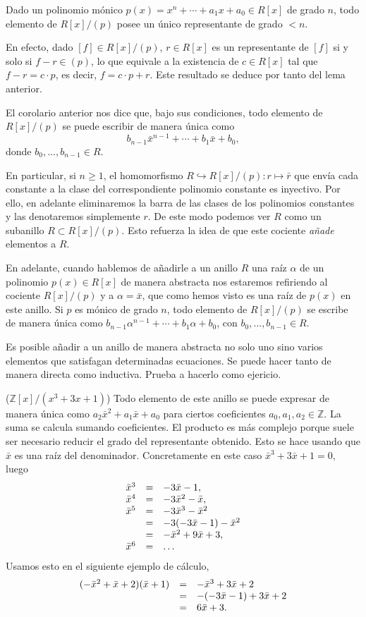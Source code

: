 \label{uniquerep} Dado un polinomio mónico
\(p(x)=x^n+\cdots + a_1x+ a_0\in R[x]\) de grado \(n\), todo elemento
de \(R[x]/(p)\) posee un único representante de grado \(<n\).


En efecto, dado \([f]\in R[x]/(p)\), \(r\in R[x]\) es un representante
de \([f]\) si y solo si \(f-r\in (p)\), lo que equivale a la existencia
de \(c\in R[x]\) tal que \(f-r=c\cdot p\), es decir, \(f=c\cdot p+r\).
Este resultado se deduce por tanto del lema anterior. 


El corolario anterior nos dice que, bajo sus condiciones, todo elemento
de \(R[x]/(p)\) se puede escribir de manera única como
\[b_{n-1}\bar{x}^{n-1}+\cdots+ b_1\bar{x}+b_0,\] donde
\(b_0,\dots, b_{n-1}\in R\).

En particular, si \(n\geq 1\), el homomorfismo
\(R\hookrightarrow R[x]/(p)\colon r\mapsto\bar{r}\) que envía cada
constante a la clase del correspondiente polinomio constante es
inyectivo. Por ello, en adelante eliminaremos la barra de las clases de
los polinomios constantes y las denotaremos simplemente \(r\). De este
modo podemos ver \(R\) como un subanillo \(R\subset R[x]/(p)\). Esto
refuerza la idea de que este cociente \emph{añade} elementos a \(R\).

En adelante, cuando hablemos de añadirle a un anillo \(R\) una raíz
\(\alpha\) de un polinomio \(p(x)\in R[x]\) de manera abstracta nos
estaremos refiriendo al cociente \(R[x]/(p)\) y a \(\alpha=\bar{x}\),
que como hemos visto es una raíz de \(p(x)\) en este anillo. Si \(p\) es
mónico de grado \(n\), todo elemento de \(R[x]/(p)\) se escribe de
manera única como \(b_{n-1}\alpha^{n-1}+\cdots+ b_1\alpha+b_0\), con
\(b_0,\dots, b_{n-1}\in R\).

Es posible añadir a un anillo de manera abstracta no solo uno sino
varios elementos que satisfagan determinadas ecuaciones. Se puede hacer
tanto de manera directa como inductiva. Prueba a hacerlo como ejericio.

\textrm{\normalfont ($\mathbb Z[x]/(x^3+3x+1)$)} Todo
elemento de este anillo se puede expresar de manera única como
\(a_2 \bar x^2+ a_1 \bar x+ a_0\) para ciertos coeficientes
\(a_0,a_1,a_2\in\mathbb Z\). La suma se calcula sumando coeficientes. El
producto es más complejo porque suele ser necesario reducir el grado del
representante obtenido. Esto se hace usando que \(\bar x\) es una raíz
del denominador. Concretamente en este caso \(\bar x^3+3\bar x+1=0\),
luego
\[\begin{array}{rcl}\bar x^3&=& -3\bar x-1,\cr \bar x^4&=& -3\bar x^2-\bar x,\cr\bar x^5&=& -3\bar x^3-\bar x^2\cr&=& -3(-3\bar x-1)-\bar x^2\cr&=&-\bar x^2+9\bar x+3,\cr\bar x^6&=&\dots\end{array}\]Usamos
esto en el siguiente ejemplo de
cálculo,\[\begin{array}{rcl}(- \bar x^2+ \bar x+ 2)(\bar x+ 1)&=& -\bar x^3+3\bar x+2\cr&=& -(-3\bar x-1)+3\bar x+2\cr&=&6\bar x+3.\end{array}\]

